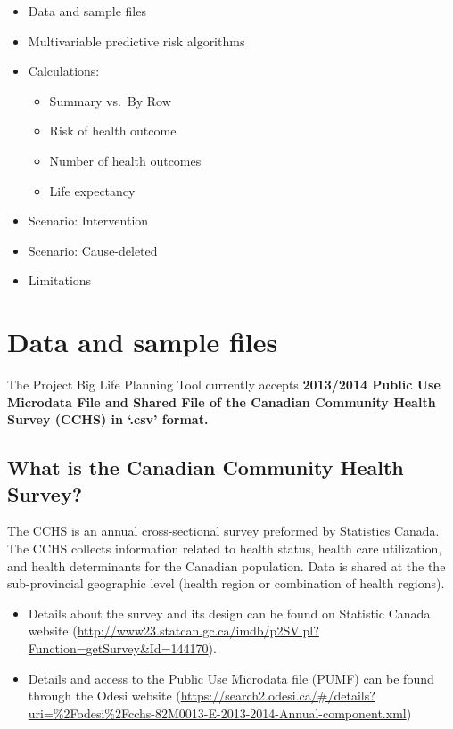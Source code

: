 \documentclass[]{book}
\providecommand{\tightlist}{%
  \setlength{\itemsep}{0pt}\setlength{\parskip}{0pt}}
\begin{document}
\begin{itemize}
\item
  Data and sample files
\item
  Multivariable predictive risk algorithms
\item
  Calculations:

  \begin{itemize}
  \tightlist
  \item
    Summary vs.~By Row
  \item
    Risk of health outcome
  \item
    Number of health outcomes
  \item
    Life expectancy
  \end{itemize}
\item
  Scenario: Intervention
\item
  Scenario: Cause-deleted
\item
  Limitations
\end{itemize}

\section{Data and sample files}\label{data-and-sample-files}

The Project Big Life Planning Tool currently accepts \textbf{2013/2014
Public Use Microdata File and Shared File of the Canadian Community
Health Survey (CCHS) in `.csv' format.}

\subsection{What is the Canadian Community Health
Survey?}\label{what-is-the-canadian-community-health-survey}

The CCHS is an annual cross-sectional survey preformed by Statistics
Canada. The CCHS collects information related to health status, health
care utilization, and health determinants for the Canadian population.
Data is shared at the the sub-provincial geographic level (health region
or combination of health regions).

\begin{itemize}
\tightlist
\item
  Details about the survey and its design can be found on Statistic
  Canada website
  (\url{http://www23.statcan.gc.ca/imdb/p2SV.pl?Function=getSurvey\&Id=144170}).
\item
  Details and access to the Public Use Microdata file (PUMF) can be
  found through the Odesi website
  (\url{https://search2.odesi.ca/\#/details?uri=\%2Fodesi\%2Fcchs-82M0013-E-2013-2014-Annual-component.xml})
\end{itemize}
\end{document}
